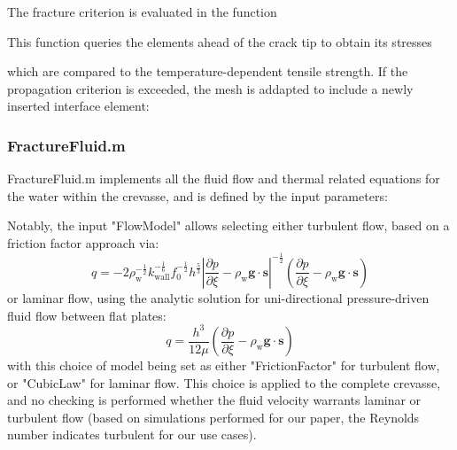 \documentclass[3p]{elsarticle} %
\begin{document}
The fracture criterion is evaluated in the function

This function queries the elements ahead of the crack tip to obtain its stresses

which are compared to the temperature-dependent tensile strength. If the propagation criterion is exceeded, the mesh is addapted to include a newly inserted interface element:


\subsubsection{FractureFluid.m}
FractureFluid.m implements all the fluid flow and thermal related equations for the water within the crevasse, and is defined by the input parameters:

Notably, the input "FlowModel" allows selecting either turbulent flow, based on a friction factor approach via:
\begin{equation}
    q = -2\rho_{\text{w}}^{-\frac{1}{2}}k_{\text{wall}}^{-\frac{1}{6}}f_0^{-\frac{1}{2}} h^{\frac{5}{3}}\left|\frac{\partial p}{\partial \xi}-\rho_{\text{w}} \mathbf{g} \cdot \mathbf{s}\right|^{-\frac{1}{2}}\left(\frac{\partial p}{\partial \xi}-\rho_{\text{w}} \mathbf{g} \cdot \mathbf{s}\right) \label{eq:qx}
\end{equation}
or laminar flow, using the analytic solution for uni-directional pressure-driven fluid flow between flat plates:
\begin{equation}
	q = \frac{h^3}{12\mu} \left(\frac{\partial p}{\partial \xi}-\rho_{\text{w}} \mathbf{g} \cdot \mathbf{s}\right)
\end{equation}
with this choice of model being set as either "FrictionFactor" for turbulent flow, or "CubicLaw" for laminar flow. This choice is applied to the complete crevasse, and no checking is performed whether the fluid velocity warrants laminar or turbulent flow (based on simulations performed for our paper, the Reynolds number indicates turbulent for our use cases). 
\end{document}
